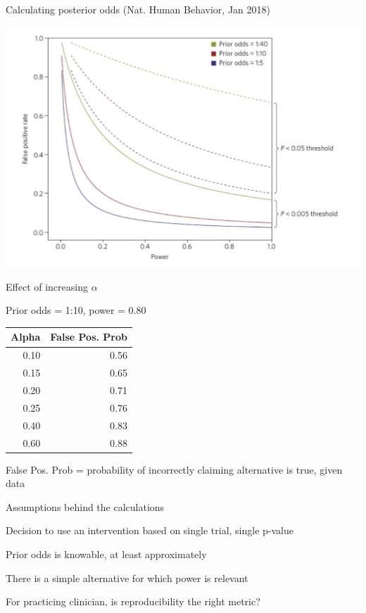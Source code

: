 \documentclass[ignorenonframetext,]{beamer}
\begin{document}
\begin{frame}{Calculating posterior odds (Nat. Human Behavior, Jan
2018)}
\protect\hypertarget{calculating-posterior-odds-nat.-human-behavior-jan-2018}{}

\includegraphics[width=1\textwidth,height=\textheight]{../figures/ppv_threshold.jpeg}

\end{frame}

\begin{frame}{Effect of increasing \(\alpha\)}
\protect\hypertarget{effect-of-increasing-alpha}{}

Prior odds = 1:10, power = 0.80

\begin{longtable}[]{@{}rr@{}}
\toprule
Alpha & False Pos. Prob\tabularnewline
\midrule
\endhead
0.10 & 0.56\tabularnewline
0.15 & 0.65\tabularnewline
0.20 & 0.71\tabularnewline
0.25 & 0.76\tabularnewline
0.40 & 0.83\tabularnewline
0.60 & 0.88\tabularnewline
\bottomrule
\end{longtable}

False Pos. Prob = probability of incorrectly claiming alternative is
true, given data

\end{frame}

\begin{frame}{Assumptions behind the calculations}
\protect\hypertarget{assumptions-behind-the-calculations}{}

Decision to use an intervention based on single trial, single p-value

Prior odds is knowable, at least approximately

There is a simple alternative for which power is relevant

For practicing clinician, is reproducibility the right metric?

\end{frame}
\end{document}
